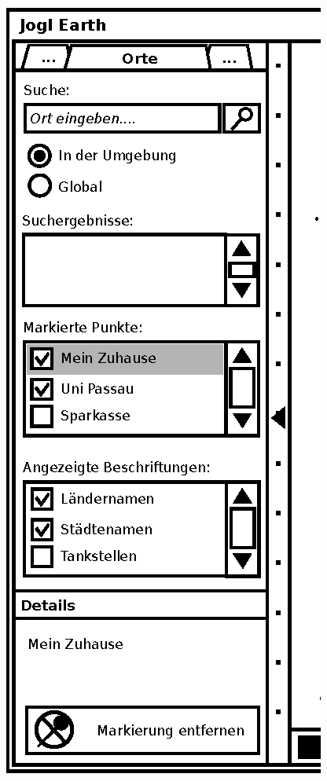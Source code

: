 \documentclass[10pt]{scrreprt}
\begin{document}
\begin{figure}
	\centering
		\begin{minipage}[c]{6cm}
        \centering
                \includegraphics[scale=0.9]{GUI-Orte.eps}
        \end{minipage}
        \begin{minipage}[c]{6cm}

\end{minipage}
\end{figure}
\end{document}
